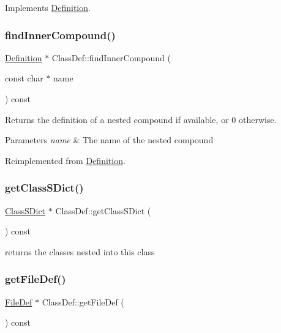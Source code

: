 Implements \mbox{\hyperlink{class_definition_ac4741f70f06baac174cf71b3e11d06ac}{Definition}}.

\mbox{\label{class_class_def_a0412b4964163665b778c682fd52f91c4}} 
\subsubsection{\texorpdfstring{findInnerCompound()}{findInnerCompound()}}
{\footnotesize\ttfamily \mbox{\hyperlink{class_definition}{Definition}} $\ast$ Class\+Def\+::find\+Inner\+Compound (\begin{DoxyParamCaption}\item[{const char $\ast$}]{name }\end{DoxyParamCaption}) const\hspace{0.3cm}{\ttfamily [virtual]}}

Returns the definition of a nested compound if available, or 0 otherwise. 
\begin{DoxyParams}{Parameters}
{\em name} & The name of the nested compound \\
\hline
\end{DoxyParams}


Reimplemented from \mbox{\hyperlink{class_definition}{Definition}}.

\mbox{\label{class_class_def_afc398c93456eb0c801adc3fc3a5929f0}} 
\subsubsection{\texorpdfstring{getClassSDict()}{getClassSDict()}}
{\footnotesize\ttfamily \mbox{\hyperlink{class_class_s_dict}{Class\+S\+Dict}} $\ast$ Class\+Def\+::get\+Class\+S\+Dict (\begin{DoxyParamCaption}{ }\end{DoxyParamCaption}) const}

returns the classes nested into this class \mbox{\label{class_class_def_ae3fcef93fb9e95b5e5f9475bf26c5cd9}} 
\subsubsection{\texorpdfstring{getFileDef()}{getFileDef()}}
{\footnotesize\ttfamily \mbox{\hyperlink{class_file_def}{File\+Def}} $\ast$ Class\+Def\+::get\+File\+Def (\begin{DoxyParamCaption}{ }\end{DoxyParamCaption}) const}

